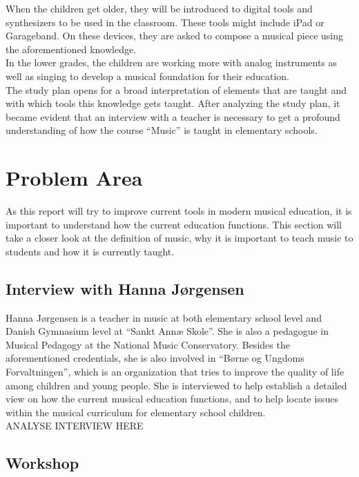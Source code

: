When the children get older, they will be introduced to digital tools and synthesizers to be used in the classroom. These tools might include iPad or Garageband. On these devices, they are asked to compose a musical piece using the aforementioned knowledge.\\
In the lower grades, the children are working more with analog instruments as well as singing to develop a musical foundation for their education.
\\

The study plan opens for a broad interpretation of elements that are taught and with which tools this knowledge gets taught. After analyzing the study plan, it became evident that an interview with a teacher is necessary to get a profound understanding of how the course “Music” is taught in elementary schools.\\

\section{Problem Area}
As this report will try to improve current tools in modern musical education, it is important to understand how the current education functions. This section will take a closer look at the definition of music, why it is important to teach music to students and how it is currently taught.\\	



\subsection{Interview with Hanna Jørgensen}
Hanna Jørgensen is a teacher in music at both elementary school level and Danish Gymnasium level at “Sankt Annæ Skole”. She is also a pedagogue in Musical Pedagogy at the National Music Conservatory. Besides the aforementioned credentials, she is also involved in “Børne og Ungdoms Forvaltningen”, which is an organization that tries to improve the quality of life among children and young people. She is interviewed to help establish a detailed view on how the current musical education functions, and to help locate issues within the musical curriculum for elementary school children.\\

ANALYSE INTERVIEW HERE\\

\subsection{Workshop}
	
